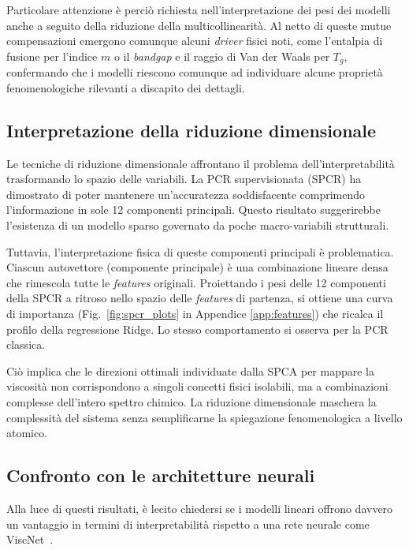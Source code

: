 \documentclass[../main.tex]{subfiles}
\begin{document}
	\newpage
	Particolare attenzione è perciò richiesta nell'interpretazione dei pesi dei modelli anche a seguito della riduzione della multicollinearità.
	Al netto di queste mutue compensazioni emergono comunque alcuni \textit{driver} fisici noti, come l'entalpia di fusione per l'indice $m$ o il \textit{bandgap} e il raggio di Van der Waals per $T_g$, confermando che i modelli riescono comunque ad individuare alcune proprietà fenomenologiche rilevanti a discapito dei dettagli.
	
	
	\subsection{Interpretazione della riduzione dimensionale}
	
	Le tecniche di riduzione dimensionale affrontano il problema dell'interpretabilità trasformando lo spazio delle variabili. La PCR supervisionata (SPCR) ha dimostrato di poter mantenere un'accuratezza soddisfacente comprimendo l'informazione in sole 12 componenti principali. Questo risultato suggerirebbe l'esistenza di un modello sparso governato da poche macro-variabili strutturali. 
	
	Tuttavia, l'interpretazione fisica di queste componenti principali è problematica. Ciascun autovettore (componente principale) è una combinazione lineare densa che rimescola tutte le \textit{features} originali. Proiettando i pesi delle 12 componenti della SPCR a ritroso nello spazio delle \textit{features} di partenza, si ottiene una curva di importanza (Fig.~\ref{fig:spcr_plots} in Appendice \ref{app:features}) che ricalca il profilo della regressione Ridge. Lo stesso comportamento si osserva per la PCR classica. 
	
	Ciò implica che le direzioni ottimali individuate dalla SPCA per mappare la viscosità non corrispondono a singoli concetti fisici isolabili, ma a combinazioni complesse dell'intero spettro chimico. La riduzione dimensionale maschera la complessità del sistema senza semplificarne la spiegazione fenomenologica a livello atomico.
	
	\subsection{Confronto con le architetture neurali}
	
	Alla luce di questi risultati, è lecito chiedersi se i modelli lineari offrono davvero un vantaggio in termini di interpretabilità rispetto a una rete neurale come ViscNet~\cite{cassarViscNetNeuralNetwork2021}.
	
\end{document}
